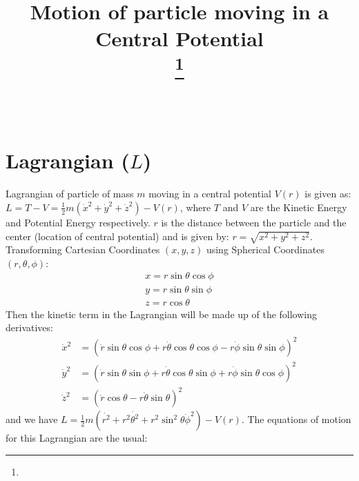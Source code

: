 \documentclass[conference]{IEEEtran}
\begin{document}
\title{Motion of particle moving in a Central Potential \\
{\footnotesize \textsuperscript{}}
\thanks{}
}

\author{
\IEEEauthorblockN{} \\}

\maketitle

\section{\textbf{Lagrangian ($L$)}}
Lagrangian of particle of mass $m$ moving in a central potential $V(r)$ is given as: 
$ L = T - V  = \frac{1}{2} m\left(\dot{x}^{2}+\dot{y}^{2}+\dot{z}^{2}\right)-V(r) $, where $T$ and $V$ are the Kinetic Energy and Potential Energy respectively. $r$ is the distance between the particle and the center (location of central potential) and is given by: $r=\sqrt{x^{2}+y^{2}+z^{2}}$. Transforming Cartesian Coordinates $(x,y,z)$ using Spherical Coordinates $(r,\theta,\phi)$:
\begin{equation}
\begin{array}{l}
x=r \sin \theta \cos \phi \\
y=r \sin \theta \sin \phi \\
z=r \cos \theta
\end{array}
\end{equation}
Then the kinetic term in the Lagrangian will be made up of the following derivatives:
\begin{equation}
\begin{aligned}
\dot{x}^{2} &=(\dot{r} \sin \theta \cos \phi+r \dot{\theta} \cos \theta \cos \phi-r \dot{\phi} \sin \theta \sin \phi)^{2} \\
\dot{y}^{2} &=(\dot{r} \sin \theta \sin \phi+r \dot{\theta} \cos \theta \sin \phi+r \dot{\phi} \sin \theta \cos \phi)^{2} \\
\dot{z}^{2} &=(\dot{r} \cos \theta-r \dot{\theta} \sin \theta)^{2}
\end{aligned}
\end{equation}
and we have $L=\frac{1}{2} m\left(\dot{r^{2}}+r^{2} \dot{\theta^{2}}+r^{2} \sin ^{2} \theta{\dot \phi^{2}}\right)-V(r)$. The equations of motion for this Lagrangian are the usual:
\end{document}
